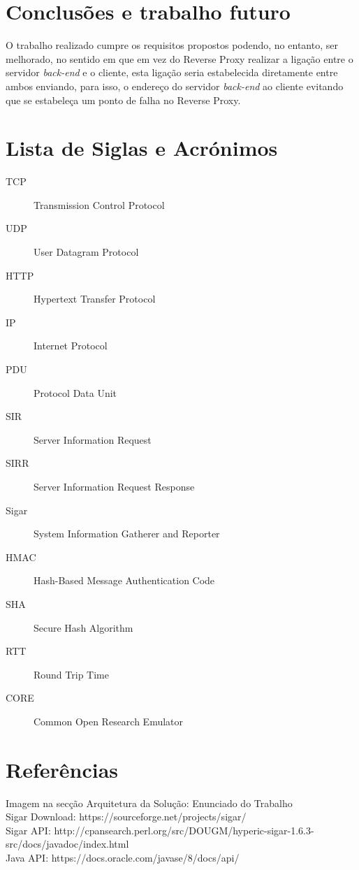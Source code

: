 \documentclass{article}
\begin{document}
\section{Conclusões e trabalho futuro}
O trabalho realizado cumpre os requisitos propostos podendo, no entanto, ser melhorado, no sentido em que em vez do Reverse Proxy realizar a ligação entre o servidor \textit{back-end} e o cliente, esta ligação seria estabelecida diretamente entre ambos enviando, para isso, o endereço do servidor \textit{back-end} ao cliente evitando que se estabeleça um ponto de falha no Reverse Proxy.

\section{Lista de Siglas e Acrónimos}
\begin{description}
    \item [TCP] Transmission Control Protocol
    \item [UDP] User Datagram Protocol
    \item [HTTP] Hypertext Transfer Protocol
    \item [IP] Internet Protocol
    \item [PDU] Protocol Data Unit
    \item [SIR] Server Information Request
    \item [SIRR] Server Information Request Response
    \item [Sigar] System Information Gatherer and Reporter
    \item [HMAC] Hash-Based Message Authentication Code
    \item [SHA] Secure Hash Algorithm
    \item [RTT] Round Trip Time
    \item [CORE] Common Open Research Emulator
\end{description}

\section{Referências}
Imagem na secção Arquitetura da Solução: Enunciado do Trabalho\\
Sigar Download: https://sourceforge.net/projects/sigar/\\
Sigar API: http://cpansearch.perl.org/src/DOUGM/hyperic-sigar-1.6.3-src/docs/javadoc/index.html\\
Java API: https://docs.oracle.com/javase/8/docs/api/\\
\end{document}
